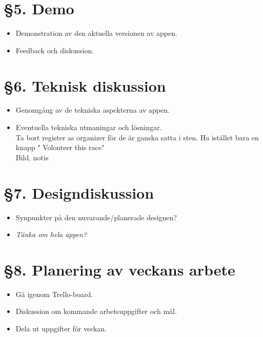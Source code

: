 \documentclass[a4paper, 11pt]{article}
\begin{document}
\section*{§5. Demo}

\begin{itemize}
    \item Demonstration av den aktuella versionen av appen.\\
    \item Feedback och diskussion.\\
\end{itemize}

\section*{§6. Teknisk diskussion }

\begin{itemize}
    \item Genomgång av de tekniska aspekterna av appen.\\
    
    \item Eventuella tekniska utmaningar och lösningar.\\
    Ta bort register as organizer för de är ganska satta i sten. Ha istället bara en knapp " Volonteer this race" \\
    Bild, notis 
    
\end{itemize}

\section*{§7. Designdiskussion}

\begin{itemize}
    \item Synpunkter på den nuvarande/planerade designen? \\
    \item \textit{Tänka om hela appen?}\\
    
    
\end{itemize}

\section*{§8. Planering av veckans arbete}
\begin{itemize}
    \item Gå igenom Trello-board.\\
    \item Diskussion om kommande arbetsuppgifter och mål.\\
    \item Dela ut uppgifter för veckan.\\
\end{itemize}
\end{document}
